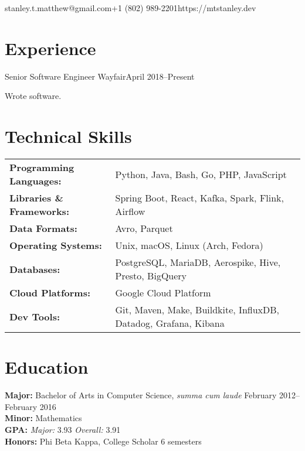 \documentclass[10pt]{resume}
\begin{document}

\vspace{0.5em}
{stanley.t.matthew@gmail.com}{+1 (802) 989-2201}{https://mtstanley.dev}

\section{Experience}

\expblock
{Senior Software Engineer \textnormal{Wayfair}}{April 2018--Present}
{
    \item Wrote software. %
}

\section{Technical Skills}

\begin{tabular}{>{\bfseries}l l}
Programming Languages:  &  Python, Java, Bash, Go, PHP, JavaScript                         \\
Libraries \& Frameworks:&  Spring Boot, React, Kafka, Spark, Flink, Airflow                \\
Data Formats:           &  Avro, Parquet                                                   \\
Operating Systems:      &  Unix, macOS, Linux (Arch, Fedora)                               \\
Databases:              &  PostgreSQL, MariaDB, Aerospike, Hive, Presto, BigQuery          \\
Cloud Platforms:        &  Google Cloud Platform                                           \\
Dev Tools:              &  Git, Maven, Make, Buildkite, InfluxDB, Datadog, Grafana, Kibana \\
\end{tabular}

\section{Education}

\textbf{Major:} Bachelor of Arts in Computer Science, \textit{summa cum laude} \hfill February 2012--February 2016\\
\textbf{Minor:} Mathematics\\
\textbf{GPA:} \textit{Major:} 3.93 \textit{Overall:} 3.91\\
\textbf{Honors:} Phi Beta Kappa, College Scholar 6 semesters
\end{document}
